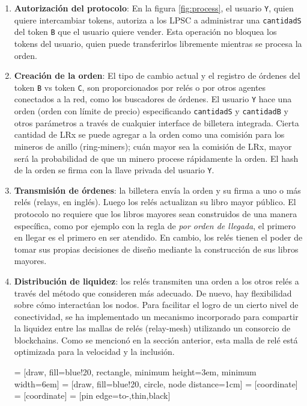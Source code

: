 \documentclass[UTF8,nofonts]{article}
\makeatletter
\newenvironment{figurehere}
 {\def\@captype{figure}}
 {}
\makeatother
\begin{document}
\begin{multicols}{2}
\begin{enumerate}
\item \textbf{Autorizaci\'on del protocolo}: En la figura \ref{fig:process}, el usuario \verb|Y|, quien quiere intercambiar tokens, autoriza a los LPSC a administrar una \verb|cantidadS| del token \verb|B| que el usuario quiere vender. Esta operaci\'on no bloquea los tokens del usuario, quien puede transferirlos libremente mientras se procesa la orden.

\item \textbf{Creaci\'on de la orden}: El tipo de cambio actual y el registro de \'ordenes del token \verb|B| vs token \verb|C|, son proporcionados por rel\'es o por otros agentes conectados a la red, como los buscadores de \'ordenes. El usuario \verb|Y| hace una orden (orden con l\'imite de precio) especificando  \verb|cantidadS| y \verb|cantidadB| y otros par\'ametros a trav\'es de cualquier interface de billetera integrada. Cierta cantidad de LRx se puede agregar a la orden como una comisi\'on para los mineros de anillo (ring-miners); cu\'an mayor sea la comisi\'on de LRx, mayor ser\'a la probabilidad de que un minero procese r\'apidamente la orden. El hash de la orden se firma con la llave privada del usuario \verb|Y|.

\item \textbf{Transmisi\'on de \'ordenes}: la billetera env\'ia la orden y su firma a uno o m\'as rel\'es (relays, en ingl\'es). Luego los rel\'es actualizan su libro mayor p\'ublico. El protocolo no requiere que los libros mayores sean construidos de una manera espec\'ifica, como por ejemplo con la regla de  \textit{por orden de llegada}, el primero en llegar es el primero en ser atendido. En cambio, los rel\'es tienen el poder de tomar sus propias decisiones de dise\~no mediante la construcci\'on de sus libros mayores.

\item \textbf{Distribuci\'on de liquidez}: los rel\'es transmiten una orden a los otros rel\'es a trav\'es del m\'etodo que consideren m\'as adecuado. De nuevo, hay flexibilidad sobre c\'omo interact\'uan los nodos. Para facilitar el logro de un cierto nivel de conectividad, se ha implementado un mecanismo incorporado para compartir la liquidez entre las mallas de rel\'es (relay-mesh) utilizando un consorcio de blockchains. Como se mencion\'o en la secci\'on anterior, esta malla de rel\'e est\'a optimizada para la velocidad y la inclusi\'on.

\begin{center}
\begin{figurehere}
\centering
{} = [draw, fill=blue!20, rectangle, 
    minimum height=3em, minimum width=6em]
 = [draw, fill=blue!20, circle, node distance=1cm]
 = [coordinate]
 = [coordinate]
 = [pin edge={to-,thin,black}]


\end{figurehere}
\end{center}
\end{enumerate}
\end{multicols}
\end{document}
